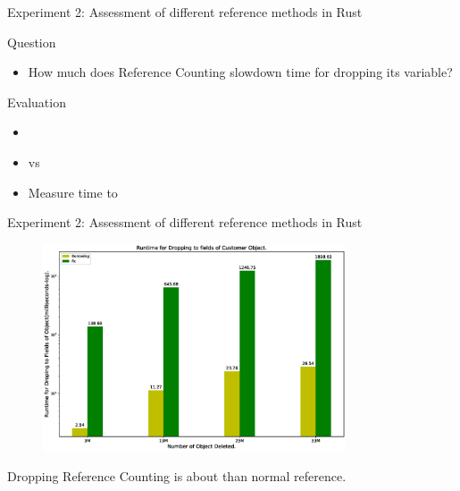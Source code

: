 \documentclass[9pt]{beamer}
\begin{document}

\begin{frame}[fragile]{Experiment 2: Assessment of different reference methods in Rust}
    
    Question
    \begin{itemize}
        \item How much does Reference Counting slowdown time for dropping its variable? 
    \end{itemize} 

    Evaluation
    \begin{itemize}
        \item {} 
        \item {} vs 
        \item Measure time to 
    \end{itemize}

\end{frame}



\begin{frame}[fragile]{Experiment 2: Assessment of different reference methods in Rust}

    \begin{figure}[hp]
        \centering
        \begin{center}
                \includegraphics[width=0.8\textwidth]{images/rust_droptime_borring_rc.eps}
                \captionsetup{labelformat=empty}
        \end{center}
    \end{figure}
    Dropping Reference Counting is about  than normal reference. 
\end{frame}
\end{document}
